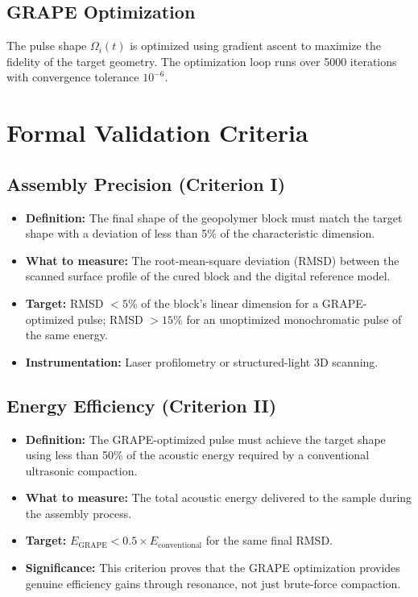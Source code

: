 \documentclass[12pt]{article}
\begin{document}
\subsection{GRAPE Optimization}
The pulse shape $\Omega_i(t)$ is optimized using gradient ascent to maximize the fidelity of the target geometry. The optimization loop runs over 5000 iterations with convergence tolerance $10^{-6}$.

\section{Formal Validation Criteria}

\subsection{Assembly Precision (Criterion I)}
\begin{itemize}
    \item \textbf{Definition:} The final shape of the geopolymer block must match the target shape with a deviation of less than 5\% of the characteristic dimension.
    \item \textbf{What to measure:} The root-mean-square deviation (RMSD) between the scanned surface profile of the cured block and the digital reference model.
    \item \textbf{Target:} RMSD $< 5\%$ of the block's linear dimension for a GRAPE-optimized pulse; RMSD $> 15\%$ for an unoptimized monochromatic pulse of the same energy.
    \item \textbf{Instrumentation:} Laser profilometry or structured-light 3D scanning.
\end{itemize}

\subsection{Energy Efficiency (Criterion II)}
\begin{itemize}
    \item \textbf{Definition:} The GRAPE-optimized pulse must achieve the target shape using less than 50\% of the acoustic energy required by a conventional ultrasonic compaction.
    \item \textbf{What to measure:} The total acoustic energy delivered to the sample during the assembly process.
    \item \textbf{Target:} $E_{\text{GRAPE}} < 0.5 \times E_{\text{conventional}}$ for the same final RMSD.
    \item \textbf{Significance:} This criterion proves that the GRAPE optimization provides genuine efficiency gains through resonance, not just brute-force compaction.
\end{itemize}
\end{document}

